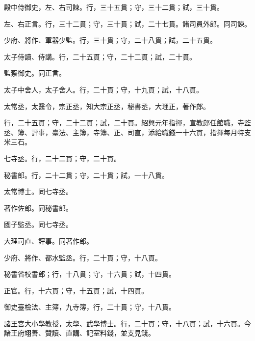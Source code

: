 \begin{pinyinscope}
 殿中侍御史，左、右司諫。行，三十五貫；守，三十二貫；試，三十貫。



 左、右正言。行，三十二貫；守，三十貫；試，二十七貫。諸司員外郎。同司諫。



 少府、將作、軍器少監。行，三十貫；守，二十八貫；試，二十五貫。



 太子侍讀、侍講。行，二十五貫；守，二十二貫；試，二十貫。



 監察御史。同正言。



 太子中舍人，太子舍人。行，二十貫；守，十九貫；試，十八貫。



 太常丞，太醫令，宗正丞，知大宗正丞，秘書丞，大理正，著作郎。



 行，二十五貫；守，二十二貫；試，二十貫。紹興元年指揮，宣教郎任館職，寺監丞、簿、評事，臺法、主簿，寺簿、正、司直，添給職錢一十六貫，指揮每月特支米三石。



 七寺丞。行，二十二貫；守，二十貫。



 秘書郎。行，二十二貫；守，二十貫；試，一十八貫。



 太常博士。同七寺丞。



 著作佐郎。同秘書郎。



 國子監丞。同七寺丞。



 大理司直、評事。同著作郎。



 少府、將作、都水監丞。行，二十貫；守，十八貫。



 秘書省校書郎；行，十八貫；守，十六貫；試，十四貫。



 正官。行，十六貫；守，十五貫；試，十四貫。



 御史臺檢法、主簿，九寺簿，行，二十貫；守，十八貫。



 諸王宮大小學教授，太學、武學博士。行，二十貫；守，十八貫；試，十六貫。今諸王府翊善、贊讀、直講、記室料錢，並支見錢。




\end{pinyinscope}
